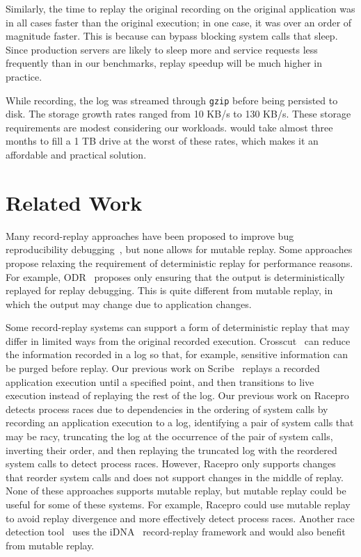 Similarly, the time to replay the original recording on the original application
was in all cases faster than the original execution; in one case, it was over an
order of magnitude faster.
This is because {\dora} can bypass blocking system calls that sleep.
Since production servers are likely to sleep more and
service requests less frequently than in our benchmarks, replay
speedup will be much higher in practice.

While recording, the log was streamed through {\tt gzip} before being persisted to
disk. The storage growth rates ranged from 10 KB/s to 130 KB/s. These
storage requirements are modest considering our workloads. {\dora}
would take almost three months to fill a 1 TB drive at the worst
of these rates, which makes it an affordable and practical solution.

\section{Related Work}
\label{dora:sec:related}

Many record-replay approaches have been proposed to improve bug 
reproducibility
debugging~\cite{idna:vee06,decouple:usenix08,instant-replay,r2:osdi,odr:sosp09,pinsel:pldi07,pres:sosp09,jockey,srinivasan:flashback,subhraveti:sigmetrics11},
but none allows for mutable replay. Some
approaches
propose relaxing the requirement of deterministic replay for performance
reasons. For example, ODR~\cite{odr:sosp09} proposes only ensuring that the
output is deterministically replayed for replay debugging. This is
quite different from mutable replay, in which the output may
change due to application changes.

Some record-replay systems can support a form of deterministic replay
that may differ in limited ways from the original recorded
execution. Crosscut~\cite{crosscut} can reduce the information
recorded in a log
so that, for example, sensitive information can be
purged before
replay. Our previous work on Scribe~\cite{scribe:sigmetrics10} replays a recorded
application execution until a specified
point, and then transitions to
live execution instead of replaying the rest of the
log. Our previous work on Racepro~\cite{racepro:sosp11} detects process races due to
dependencies in the ordering of system calls by recording an
application execution to a log, identifying a pair of system calls
that may be racy, truncating the log at the occurrence of the pair of
system calls, inverting their order, and then replaying the truncated
log with the reordered system calls to detect process
races.  However, Racepro only supports changes that reorder system calls and
does not support changes in the middle of replay.
None of these approaches supports mutable replay,
but mutable replay could be useful for some of these systems.  For
example, Racepro could use mutable replay to avoid replay
divergence and more effectively detect process races.  Another race
detection tool~\cite{pinsel:pldi07} uses the iDNA~\cite{idna:vee06}
record-replay framework and would also benefit from mutable replay.

